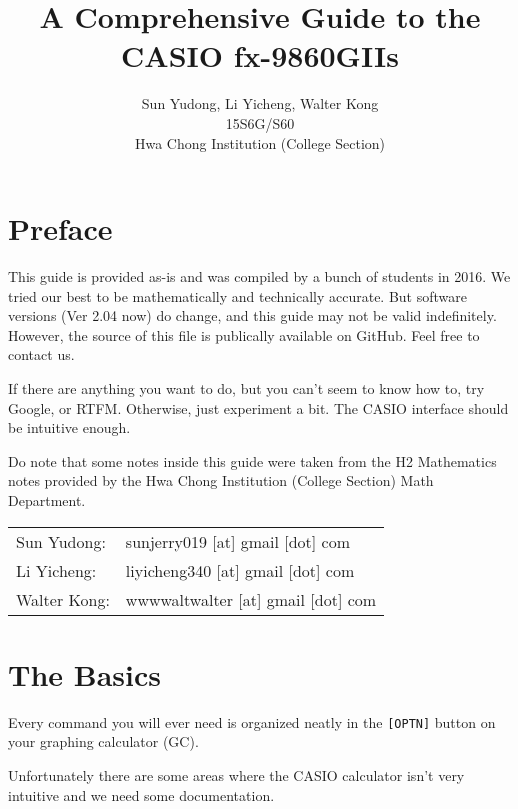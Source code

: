 \documentclass[a5paper,draft]{memoir}
\title{A Comprehensive Guide to the CASIO fx-9860GIIs}
\author{Sun Yudong, Li Yicheng, Walter Kong \\ 15S6G/S60 \\ Hwa Chong Institution (College Section)}
\def\code#1{\texttt{#1}}
\begin{document}
\begin{titlingpage}
	\maketitle
\end{titlingpage}

\frontmatter

\tableofcontents

\chapter{Preface}
This guide is provided as-is and was compiled by a bunch of students in 2016. We tried our best to be mathematically and technically accurate. But software versions (Ver 2.04 now) do change, and this guide may not be valid indefinitely. However, the source of this file is publically available on GitHub. Feel free to contact us.

If there are anything you want to do, but you can't seem to know how to, try Google, or RTFM. Otherwise, just experiment a bit. The CASIO interface should be intuitive enough.

Do note that some notes inside this guide were taken from the H2 Mathematics notes provided by the Hwa Chong Institution (College Section) Math Department. 

\vspace{0.7cm}

\begin{tabular}{l l}
	Sun Yudong: & sunjerry019 [at] gmail [dot] com \\
	Li Yicheng: & liyicheng340 [at] gmail [dot] com \\
	Walter Kong: & wwwwaltwalter [at] gmail [dot] com
\end{tabular}


\mainmatter
\chapter{The Basics}
Every command you will ever need is organized neatly in the \code{[OPTN]} button on your graphing calculator (GC).

Unfortunately there are some areas where the CASIO calculator isn't very intuitive and we need some documentation.
\end{document}
